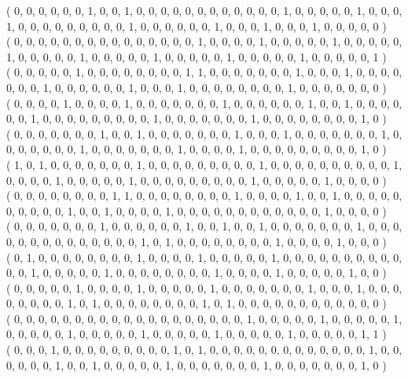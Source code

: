 \documentclass{article}
\begin{document}
{( 0, 0, 0, 0, 0, 0, 1, 0, 0, 1, 0, 0, 0, 0, 0, 0, 0, 0, 0, 0, 0, 0, 1, 0, 0, 0, 0, 0, 1, 0, 0, 0, 1, 0, 0, 0, 0, 0, 0, 0, 0, 0, 1, 0, 0, 0, 0, 0, 0, 1, 0, 0, 0, 1, 0, 0, 0, 1, 0, 0, 0, 0, 0 )\\
( 0, 0, 0, 0, 0, 0, 0, 0, 0, 0, 0, 0, 0, 0, 0, 1, 0, 0, 0, 0, 1, 0, 0, 0, 0, 0, 1, 0, 0, 0, 0, 0, 1, 0, 0, 0, 0, 0, 1, 0, 0, 0, 0, 0, 1, 0, 0, 0, 0, 0, 1, 0, 0, 0, 0, 0, 1, 0, 0, 0, 0, 0, 1 )\\
( 0, 0, 0, 0, 0, 1, 0, 0, 0, 0, 0, 0, 0, 0, 1, 1, 0, 0, 0, 0, 0, 0, 0, 1, 0, 0, 0, 1, 0, 0, 0, 0, 0, 0, 0, 1, 0, 0, 0, 0, 0, 0, 1, 0, 0, 0, 1, 0, 0, 0, 0, 0, 0, 0, 0, 1, 0, 0, 0, 0, 0, 0, 0 )\\
( 0, 0, 0, 0, 1, 0, 0, 0, 0, 1, 0, 0, 0, 0, 0, 0, 0, 1, 0, 0, 0, 0, 0, 0, 1, 0, 0, 1, 0, 0, 0, 0, 0, 0, 1, 0, 0, 0, 0, 0, 0, 0, 0, 0, 1, 0, 0, 0, 0, 0, 0, 0, 1, 0, 0, 0, 0, 0, 0, 0, 0, 1, 0 )\\
( 0, 0, 0, 0, 0, 0, 0, 1, 0, 0, 1, 0, 0, 0, 0, 0, 0, 0, 1, 0, 0, 0, 1, 0, 0, 0, 0, 0, 0, 0, 1, 0, 0, 0, 0, 0, 0, 0, 1, 0, 0, 0, 0, 0, 0, 0, 1, 0, 0, 0, 0, 1, 0, 0, 0, 0, 0, 0, 0, 0, 0, 1, 0 )\\
( 1, 0, 1, 0, 0, 0, 0, 0, 0, 0, 1, 0, 0, 0, 0, 0, 0, 0, 0, 0, 1, 0, 0, 0, 0, 0, 0, 0, 0, 0, 0, 1, 0, 0, 0, 0, 1, 0, 0, 0, 0, 0, 1, 0, 0, 0, 0, 0, 0, 0, 0, 0, 1, 0, 0, 0, 0, 0, 1, 0, 0, 0, 0 )\\
( 0, 0, 0, 0, 0, 0, 0, 0, 1, 1, 0, 0, 0, 0, 0, 0, 0, 0, 1, 0, 0, 0, 0, 1, 0, 0, 1, 0, 0, 0, 0, 0, 0, 0, 0, 0, 0, 1, 0, 0, 1, 0, 0, 0, 0, 1, 0, 0, 0, 0, 0, 0, 0, 0, 0, 0, 0, 0, 1, 0, 0, 0, 0 )\\
( 0, 0, 0, 0, 0, 0, 0, 1, 0, 0, 0, 0, 0, 0, 1, 0, 0, 1, 0, 0, 1, 0, 0, 0, 0, 0, 0, 0, 1, 0, 0, 0, 0, 0, 0, 0, 0, 0, 0, 0, 0, 0, 0, 1, 0, 1, 0, 0, 0, 0, 0, 0, 0, 0, 1, 0, 0, 0, 0, 1, 0, 0, 0 )\\
( 0, 1, 0, 0, 0, 0, 0, 0, 0, 0, 1, 0, 0, 0, 0, 1, 0, 0, 0, 0, 0, 1, 0, 0, 0, 0, 0, 0, 0, 0, 0, 0, 0, 0, 1, 0, 0, 0, 0, 0, 1, 0, 0, 0, 0, 0, 0, 0, 0, 1, 0, 0, 0, 0, 1, 0, 0, 0, 0, 0, 1, 0, 0 )\\
( 0, 0, 0, 0, 0, 1, 0, 0, 0, 0, 1, 0, 0, 0, 0, 0, 1, 0, 0, 0, 0, 0, 0, 0, 1, 0, 0, 0, 1, 0, 0, 0, 0, 0, 0, 0, 0, 1, 0, 1, 0, 0, 0, 0, 0, 0, 0, 0, 1, 0, 1, 0, 0, 0, 0, 0, 0, 0, 0, 0, 0, 0, 0 )\\
( 0, 0, 0, 0, 0, 0, 0, 0, 0, 0, 0, 0, 0, 0, 0, 0, 0, 0, 0, 1, 0, 0, 0, 0, 0, 1, 0, 0, 0, 0, 0, 1, 0, 0, 0, 0, 0, 1, 0, 0, 0, 0, 0, 1, 0, 0, 0, 0, 0, 1, 0, 0, 0, 0, 0, 1, 0, 0, 0, 0, 0, 1, 1 )\\
( 0, 0, 0, 1, 0, 0, 0, 0, 0, 0, 0, 0, 0, 1, 0, 1, 0, 0, 0, 0, 0, 0, 0, 0, 0, 0, 0, 0, 0, 1, 0, 0, 0, 0, 0, 0, 1, 0, 0, 1, 0, 0, 0, 0, 0, 1, 0, 0, 0, 0, 0, 0, 0, 1, 0, 0, 0, 0, 0, 0, 0, 1, 0 )\\
}
\end{document}
